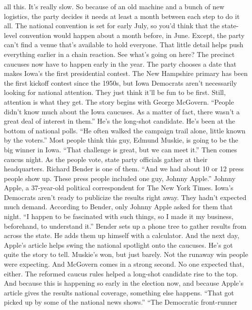 \begin{itemize}
  all this. It's really slow. So because of an old machine and a bunch
  of new logistics, the party decides it needs at least a month between
  each step to do it all. The national convention is set for early July,
  so you'd think that the state-level convention would happen about a
  month before, in June. Except, the party can't find a venue that's
  available to hold everyone. That little detail helps push everything
  earlier in a chain reaction. See what's going on here? The precinct
  caucuses now have to happen early in the year. The party chooses a
  date that makes Iowa's the first presidential contest. The New
  Hampshire primary has been the first kickoff contest since the 1950s,
  but Iowa Democrats aren't necessarily looking for national attention.
  They just think it'll be fun to be first. Still, attention is what
  they get. The story begins with George McGovern. ``People didn't know
  much about the Iowa caucuses. As a matter of fact, there wasn't a
  great deal of interest in them.'' He's the long-shot candidate. He's
  been at the bottom of national polls. ``He often walked the campaign
  trail alone, little known by the voters.'' Most people think this guy,
  Edmund Muskie, is going to be the big winner in Iowa. ``That challenge
  is great, but we can meet it.'' Then comes caucus night. As the people
  vote, state party officials gather at their headquarters. Richard
  Bender is one of them. ``And we had about 10 or 12 press people show
  up. These press people included one guy, Johnny Apple.'' Johnny Apple,
  a 37-year-old political correspondent for The New York Times. Iowa's
  Democrats aren't ready to publicize the results right away. They
  hadn't expected much demand. According to Bender, only Johnny Apple
  asked for them that night. ``I happen to be fascinated with such
  things, so I made it my business, beforehand, to understand it.''
  Bender sets up a phone tree to gather results from across the state.
  He adds them up himself with a calculator. And the next day, Apple's
  article helps swing the national spotlight onto the caucuses. He's got
  quite the story to tell. Muskie's won, but just barely. Not the
  runaway win people were expecting. And McGovern comes in a strong
  second. No one expected that, either. The reformed caucus rules helped
  a long-shot candidate rise to the top. And because this is happening
  so early in the election now, and because Apple's article gives the
  results national coverage, something else happens. ``That got picked
  up by some of the national news shows.'' ``The Democratic front-runner

\end{itemize}
